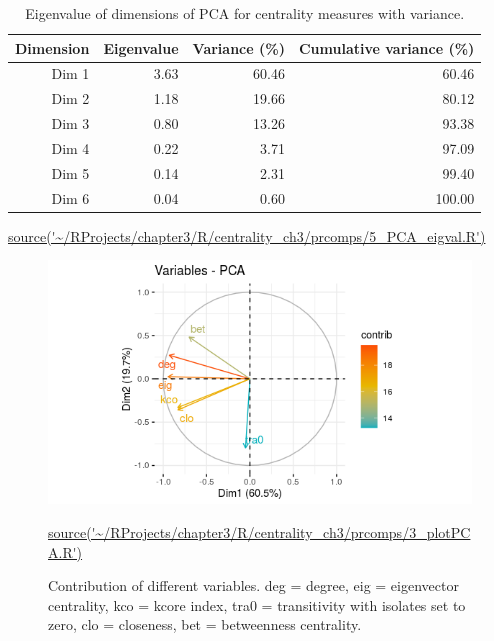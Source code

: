 \begin{table}[ht]
\centering
\begin{tabular}{rrrr}
  \toprule
Dimension & Eigenvalue & Variance (\%) & Cumulative variance (\%) \\ 
  \midrule
Dim 1 & 3.63 & 60.46 & 60.46 \\ 
  Dim 2 & 1.18 & 19.66 & 80.12 \\ 
  Dim 3 & 0.80 & 13.26 & 93.38 \\ 
  Dim 4 & 0.22 & 3.71 & 97.09 \\ 
  Dim 5 & 0.14 & 2.31 & 99.40 \\ 
  Dim 6 & 0.04 & 0.60 & 100.00 \\ 
   \bottomrule
\end{tabular}
\caption[Variance explained by PCA components of centrality measures]{Eigenvalue of dimensions of PCA for centrality measures with variance.}
\tiny\url{source('~/RProjects/chapter3/R/centrality_ch3/prcomps/5_PCA_eigval.R')}
\label{tab:Eigenvalue of dimensions of PCA for centrality measures with variance}
\end{table}


\begin{figure}
    \centering
    \includegraphics[width=\textwidth]{images/chapter3/centrality_pca_factoextra/Rplot_smaller_pca.png}
    \caption{Contribution of different variables. deg = degree, eig = eigenvector centrality, kco = kcore index, tra0 = transitivity with isolates set to zero, clo = closeness, bet = betweenness centrality.} 
    \tiny\url{source('~/RProjects/chapter3/R/centrality_ch3/prcomps/3_plotPCA.R')}
    \label{fig:PCA_contributions}
\end{figure}



